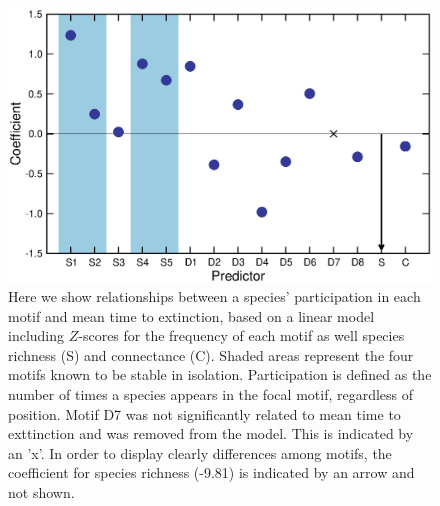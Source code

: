 \documentclass[12pt]{article}
\begin{document}
	\begin{figure}[h!]
		\caption{Here we show relationships between a species' participation in each motif and mean time to extinction, based on a linear model including $Z$-scores for the frequency of each motif as well species richness (S) and connectance (C). Shaded areas represent the four motifs known to be stable in isolation. Participation is defined as the number of times a species appears in the focal motif, regardless of position. Motif D7 was not significantly related to mean time to exttinction and was removed from the model. This is indicated by an 'x'. In order to display clearly differences among motifs, the coefficient for species richness (-9.81) is indicated by an arrow and not shown.}
		\label{motif_coefs}
		\includegraphics[width=\textwidth]{figures/extinction_order/motif_lmer_summary.eps}
		\end{figure}




\end{document}
